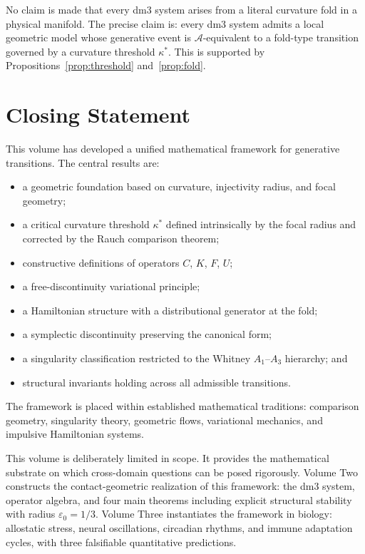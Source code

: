 \documentclass[12pt, oneside]{book}
\theoremstyle{plain}
\theoremstyle{definition}
\theoremstyle{remark}
\begin{document}
No claim is made that every dm3 system arises from a literal
curvature fold in a physical manifold. The precise claim is:
every dm3 system admits a local geometric model whose generative
event is $\mathcal{A}$-equivalent to a fold-type transition governed
by a curvature threshold $\kappa^*$. This is supported by
Propositions~\ref{prop:threshold} and~\ref{prop:fold}.

\section*{Closing Statement}

This volume has developed a unified mathematical framework for
generative transitions. The central results are:
\begin{itemize}
\item a geometric foundation based on curvature, injectivity radius,
  and focal geometry;
\item a critical curvature threshold $\kappa^*$ defined intrinsically
  by the focal radius and corrected by the Rauch comparison theorem;
\item constructive definitions of operators $C$, $K$, $F$, $U$;
\item a free-discontinuity variational principle;
\item a Hamiltonian structure with a distributional generator at the
  fold;
\item a symplectic discontinuity preserving the canonical form;
\item a singularity classification restricted to the Whitney
  $A_1$--$A_3$ hierarchy; and
\item structural invariants holding across all admissible transitions.
\end{itemize}

The framework is placed within established mathematical traditions:
comparison geometry, singularity theory, geometric flows, variational
mechanics, and impulsive Hamiltonian systems.

This volume is deliberately limited in scope. It provides the
mathematical substrate on which cross-domain questions can be posed
rigorously. Volume Two constructs the contact-geometric realization
of this framework: the dm3 system, operator algebra, and four main
theorems including explicit structural stability with radius
$\varepsilon_0 = 1/3$. Volume Three instantiates the framework in
biology: allostatic stress, neural oscillations, circadian rhythms,
and immune adaptation cycles, with three falsifiable quantitative
predictions.
\end{document}
